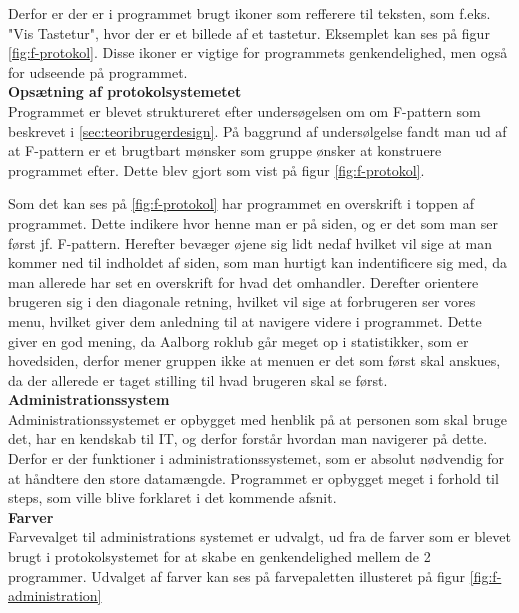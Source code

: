 Derfor er der er i programmet brugt ikoner som refferere til teksten, som f.eks. "Vis Tastetur", hvor der er et billede af et tastetur. Eksemplet kan ses på figur \ref{fig:f-protokol}. Disse ikoner er vigtige for programmets genkendelighed, men også for udseende på programmet.\\

\textbf{Opsætning af protokolsystemetet}\\
\label{sec:op_af_protokolsystem}
Programmet er blevet struktureret efter undersøgelsen om om F-pattern som beskrevet i \ref{sec:teoribrugerdesign}. På baggrund af undersølgelse fandt man ud af at F-pattern er et brugtbart mønsker som gruppe ønsker at konstruere programmet efter. Dette blev gjort som vist på figur \ref{fig:f-protokol}.


Som det kan ses på \ref{fig:f-protokol} har programmet en overskrift i toppen af programmet. Dette indikere hvor henne man er på siden, og er det som man ser først jf. F-pattern. Herefter bevæger øjene sig lidt nedaf hvilket vil sige at man kommer ned til indholdet af siden, som man hurtigt kan indentificere sig med, da man allerede har set en overskrift for hvad det omhandler. Derefter orientere brugeren sig i den diagonale retning, hvilket vil sige at forbrugeren ser vores menu, hvilket giver dem anledning til at navigere videre i programmet. Dette giver en god mening, da Aalborg roklub går meget op i statistikker, som er hovedsiden, derfor mener gruppen ikke at menuen er det som først skal anskues, da der allerede er taget stilling til hvad brugeren skal se først.\\


\textbf{Administrationssystem}\\
Administrationssystemet er opbygget med henblik på at personen som skal bruge det, har en kendskab til IT, og derfor forstår hvordan man navigerer på dette. Derfor er der funktioner i administrationssystemet, som er absolut nødvendig for at håndtere den store datamængde. Programmet er opbygget meget i forhold til steps, som ville blive forklaret i det kommende afsnit.\\


\textbf{Farver}\\
Farvevalget til administrations systemet er udvalgt, ud fra de farver som er blevet brugt i protokolsystemet for at skabe en genkendelighed mellem de 2 programmer. Udvalget af farver kan ses på farvepaletten illusteret på figur \ref{fig:f-administration}\\

